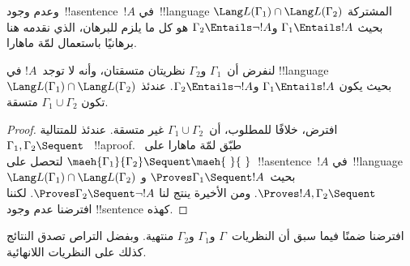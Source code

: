 \documentclass[../../../include/open-logic-section]{subfiles}
\begin{document}
وعدم وجود~!!a{sentence}~$!A$ في~!!{language} المشتركة
$\Lang L(\Gamma_1) \cap \Lang L(\Gamma_2)$ بحيث
$\Gamma_1 \Entails !A$ و$\Gamma_2 \Entails \lnot !A$ هو كل ما يلزم
للبرهان، الذي نقدمه هنا برهانيًا باستعمال لمّة ماهارا.

\begin{thm}
لنفرض أن~$\Gamma_1$ و$\Gamma_2$ نظريتان متسقتان، وأنه لا توجد~$!A$ في
!!{language}~$\Lang L(\Gamma_1) \cap \Lang L(\Gamma_2)$ بحيث يكون
$\Gamma_1 \Entails !A$ و$\Gamma_2 \Entails \lnot !A$. عندئذ تكون
$\Gamma_1 \cup \Gamma_2$ متسقة.
\end{thm}

\begin{proof}
  افترض، خلافًا للمطلوب، أن~$\Gamma_1 \cup \Gamma_2$ غير متسقة. عندئذ
  للمتتالية~$\Gamma_1, \Gamma_2 \Sequent \ $~!!a{proof}. طبّق لمّة
  ماهارا على~$\maeh{\Gamma_1}{\Gamma_2} \Sequent \maeh{\ }{\ }$
  لتحصل على~!!a{sentence}~$!A$ في~!!{language}~$\Lang L(\Gamma_1)
  \cap \Lang L(\Gamma_2)$ بحيث~$\Proves \Gamma_1 \Sequent !A$ و
  $\Proves !A, \Gamma_2 \Sequent \quad$. ومن الأخيرة ينتج لنا
  $\Proves \Gamma_2 \Sequent \lnot !A$. لكننا افترضنا عدم وجود
  !!{sentence} كهذه.
\end{proof}

افترضنا ضمنًا فيما سبق أن النظريات~$\Gamma$ و$\Gamma_1$ و$\Gamma_2$
منتهية. وبفضل التراص تصدق النتائج كذلك على النظريات اللانهائية.
\end{document}
